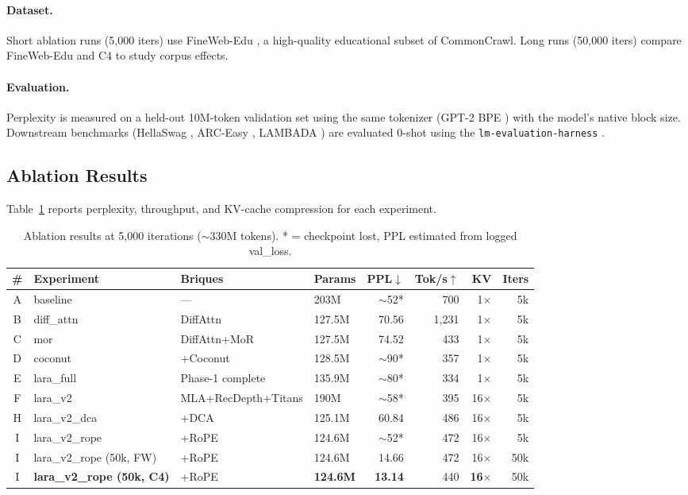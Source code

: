 \documentclass{article}
\begin{document}
\paragraph{Dataset.} Short ablation runs (5{,}000 iters) use FineWeb-Edu \citep{penedo2024fineweb}, a high-quality educational subset of CommonCrawl. Long runs (50{,}000 iters) compare FineWeb-Edu and C4 \citep{raffel2020exploring} to study corpus effects.

\paragraph{Evaluation.} Perplexity is measured on a held-out 10M-token validation set using the same tokenizer (GPT-2 BPE \citep{radford2019language}) with the model's native block size. Downstream benchmarks (HellaSwag \citep{zellers2019hellaswag}, ARC-Easy \citep{clark2018think}, LAMBADA \citep{paperno2016lambada}) are evaluated 0-shot using the \texttt{lm-evaluation-harness} \citep{eval-harness}.

\subsection{Ablation Results}

Table~\ref{tab:ablations} reports perplexity, throughput, and KV-cache compression for each experiment.

\begin{table}[h]
\centering
\caption{Ablation results at 5{,}000 iterations ($\sim$330M tokens). * = checkpoint lost, PPL estimated from logged val\_loss.}
\label{tab:ablations}
\begin{tabular}{clllrrrr}
\toprule
\# & Experiment & Briques & Params & PPL$\downarrow$ & Tok/s$\uparrow$ & KV & Iters \\
\midrule
A & baseline    & —                     & 203M   & $\sim$52*  & 700   & 1$\times$  & 5k \\
B & diff\_attn  & DiffAttn              & 127.5M & 70.56      & 1{,}231 & 1$\times$ & 5k \\
C & mor         & DiffAttn+MoR          & 127.5M & 74.52      & 433   & 1$\times$  & 5k \\
D & coconut     & +Coconut              & 128.5M & $\sim$90*  & 357   & 1$\times$  & 5k \\
E & lara\_full  & Phase-1 complete      & 135.9M & $\sim$80*  & 334   & 1$\times$  & 5k \\
F & lara\_v2    & MLA+RecDepth+Titans   & 190M   & $\sim$58*  & 395   & 16$\times$ & 5k \\
H & lara\_v2\_dca & +DCA               & 125.1M & 60.84      & 486   & 16$\times$ & 5k \\
I & lara\_v2\_rope & +RoPE             & 124.6M & $\sim$52*  & 472   & 16$\times$ & 5k \\
\midrule
I & lara\_v2\_rope (50k, FW) & +RoPE  & 124.6M & 14.66      & 472   & 16$\times$ & 50k \\
I & \textbf{lara\_v2\_rope (50k, C4)} & +RoPE & \textbf{124.6M} & \textbf{13.14} & 440 & \textbf{16$\times$} & 50k \\
\bottomrule
\end{tabular}
\end{table}
\end{document}
